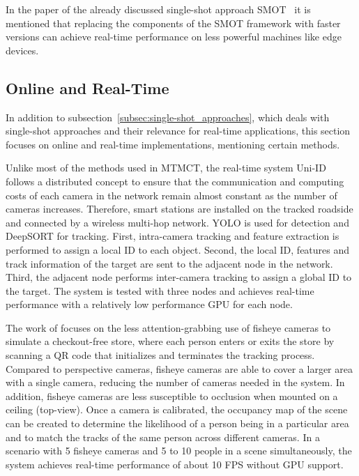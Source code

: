 In the paper of the already discussed single-shot approach SMOT~\cite{Li20} it is mentioned that replacing the components of the SMOT framework with faster versions can achieve real-time performance on less powerful machines like edge devices.

\subsection{Online and Real-Time}\label{subsec:online_and_real-time}
In addition to subsection~\ref{subsec:single-shot_approaches}, which deals with single-shot approaches and their relevance for real-time applications, this section focuses on online and real-time implementations, mentioning certain methods.

Unlike most of the methods used in MTMCT, the real-time system Uni-ID~\cite{Chen22} follows a distributed concept to ensure that the communication and computing costs of each camera in the network remain almost constant as the number of cameras increases. Therefore, smart stations are installed on the tracked roadside and connected by a wireless multi-hop network. YOLO is used for detection and DeepSORT for tracking. First, intra-camera tracking and feature extraction is performed to assign a local ID to each object. Second, the local ID, features and track information of the target are sent to the adjacent node in the network. Third, the adjacent node performs inter-camera tracking to assign a global ID to the target. The system is tested with three nodes and achieves real-time performance with a relatively low performance GPU for each node.

The work of \textcite{Wang21} focuses on the less attention-grabbing use of fisheye cameras to simulate a checkout-free store, where each person enters or exits the store by scanning a QR code that initializes and terminates the tracking process. Compared to perspective cameras, fisheye cameras are able to cover a larger area with a single camera, reducing the number of cameras needed in the system. In addition, fisheye cameras are less susceptible to occlusion when mounted on a ceiling (top-view). Once a camera is calibrated, the occupancy map of the scene can be created to determine the likelihood of a person being in a particular area and to match the tracks of the same person across different cameras. In a scenario with 5 fisheye cameras and 5 to 10 people in a scene simultaneously, the system achieves real-time performance of about 10 FPS without GPU support.

